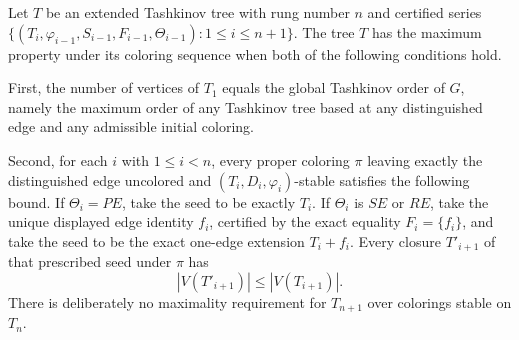 \begin{definition}
Let \(T\) be an extended Tashkinov tree with rung number \(n\) and
certified series
\(\{(T_i,\varphi_{i-1},S_{i-1},F_{i-1},\Theta_{i-1})
:1\leq i\leq n+1\}\).  The tree \(T\) has the maximum property under its
coloring sequence when both of the following conditions hold.

First, the number of vertices of \(T_1\) equals the global Tashkinov order
of \(G\), namely the maximum order of any Tashkinov tree based at any
distinguished edge and any admissible initial coloring.

Second, for each \(i\) with \(1\leq i<n\), every proper coloring \(\pi\)
leaving exactly the distinguished edge uncolored and
\((T_i,D_i,\varphi_i)\)-stable satisfies the following bound.  If
\(\Theta_i=PE\), take the seed to be exactly \(T_i\).  If
\(\Theta_i\) is \(SE\) or \(RE\), take the unique displayed edge identity
\(f_i\), certified by the exact equality \(F_i=\{f_i\}\), and take the
seed to be the exact one-edge extension \(T_i+f_i\).  Every closure
\(T'_{i+1}\) of that prescribed seed under \(\pi\) has
\[
                       |V(T'_{i+1})|\leq |V(T_{i+1})|.
\]
There is deliberately no maximality requirement for \(T_{n+1}\) over
colorings stable on \(T_n\).
\end{definition}

